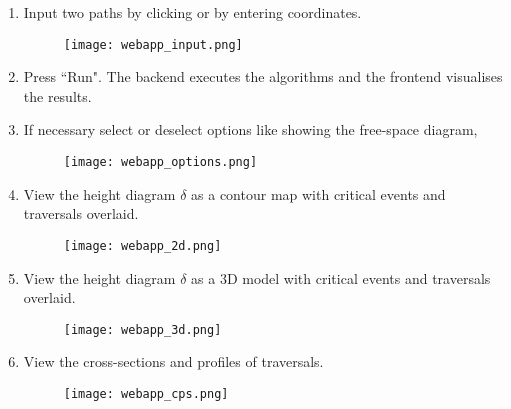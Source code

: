 \begin{enumerate}
	\item Input two paths by clicking or by entering coordinates.
	
	\begin{figure}[H]
		\centering
		\texttt{[image: webapp\_input.png]}
	\end{figure}
	
	\item Press ``Run". The backend executes the algorithms and the frontend visualises the results.

	\item If necessary select or deselect options like showing the free-space diagram, 
	
	\begin{figure}[H]
		\centering
		\texttt{[image: webapp\_options.png]}
	\end{figure}
	
	\item View the height diagram $\delta$ as a contour map with critical events and traversals overlaid.
	
	
	\begin{figure}[H]
		\centering
		\texttt{[image: webapp\_2d.png]}
	\end{figure}
	
	\item View the height diagram $\delta$ as a 3D model with critical events and traversals overlaid.
	
	\begin{figure}[H]
		\centering
		\texttt{[image: webapp\_3d.png]}
	\end{figure}
	
	\item View the cross-sections and profiles of traversals.
	
	\begin{figure}[H]
		\centering
		\texttt{[image: webapp\_cps.png]}
	\end{figure}
	
	
	
\end{enumerate}


